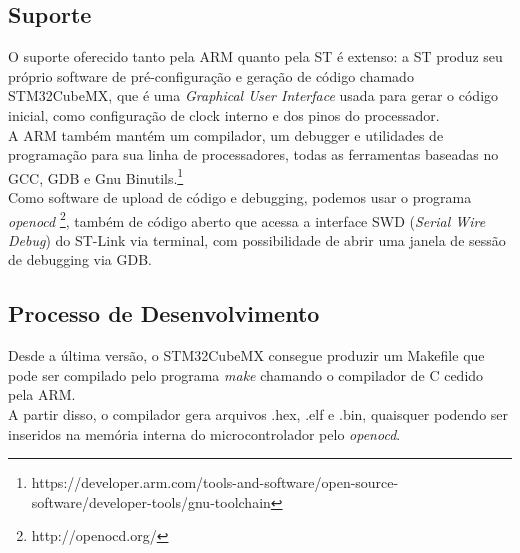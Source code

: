 \documentclass[11pt,a4paper]{report}
\begin{document}
	\subsection{Suporte}
	O suporte oferecido tanto pela ARM quanto pela ST é extenso: a ST produz seu próprio software de pré-configuração e geração de código chamado STM32CubeMX, que é uma {\it Graphical User Interface} usada para gerar o código inicial, como configuração de clock interno e dos pinos do processador.\\
	
	A ARM também mantém um compilador, um debugger e utilidades de programação para sua linha de processadores, todas as ferramentas baseadas no GCC, GDB e Gnu Binutils.\footnote{https://developer.arm.com/tools-and-software/open-source-software/developer-tools/gnu-toolchain}\\
	
	Como software de upload de código e debugging, podemos usar o programa {\it openocd} \footnote{http://openocd.org/}, também de código aberto que acessa a interface SWD ({\it Serial Wire Debug}) do ST-Link via terminal, com possibilidade de abrir uma janela de sessão de debugging via GDB.
	
	\subsection{Processo de Desenvolvimento}
	Desde a última versão, o STM32CubeMX consegue produzir um Makefile que pode ser compilado pelo programa {\it make} chamando o compilador de C cedido pela ARM.\\
	
	A partir disso, o compilador gera arquivos .hex, .elf e .bin, quaisquer podendo ser inseridos na memória interna do microcontrolador pelo {\it openocd}.\\
	
\end{document}
